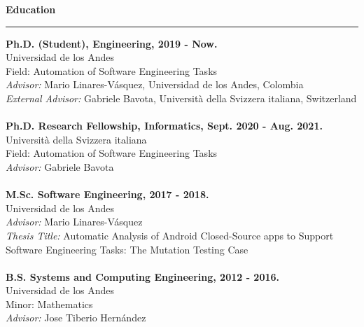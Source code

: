 \documentclass[letterpaper,11pt,oneside]{article}
\begin{document}
\noindent \Large{\textbf{Education}} \\
\vspace{-2ex}
\hrule 
\normalsize
\vspace{2ex}
\noindent \textbf{Ph.D. (Student), Engineering, 2019 - Now.} \\
	Universidad de los Andes \\
	Field: Automation of Software Engineering Tasks \\
	\textit{Advisor:} Mario Linares-V\'{a}squez, Universidad de los Andes, Colombia \\
	\textit{External Advisor:} Gabriele Bavota, Università della Svizzera italiana, Switzerland \\
	\\
\textbf{Ph.D. Research Fellowship, Informatics, Sept. 2020 - Aug. 2021.} \\
	Università della Svizzera italiana \\
	Field: Automation of Software Engineering Tasks \\
	\textit{Advisor:} Gabriele Bavota \\
	\\
\textbf{M.Sc. Software Engineering, 2017 - 2018.} \\
	Universidad de los Andes \\
	\textit{Advisor:} Mario Linares-V\'{a}squez \\
	\textit{Thesis Title:} Automatic Analysis of Android Closed-Source apps to Support Software Engineering Tasks: The Mutation Testing Case \\
	\\
\textbf{B.S. Systems and Computing Engineering, 2012 - 2016.} \\
	Universidad de los Andes \\
	Minor: Mathematics \\
	\textit{Advisor:} Jose Tiberio Hern\'{a}ndez \\
	
\end{document}
